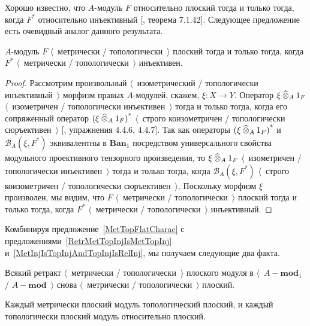 Хорошо известно, что $A$-модуль $F$ относительно плоский тогда и только тогда,
когда $F^*$ относительно инъективный [\cite{HelBanLocConvAlg}, теорема 7.1.42].
Следующее предложение есть очевидный аналог данного результата.

\begin{proposition}\label{MetTopFlatCharac} $A$-модуль $F$ $\langle$~метрически
/ топологически~$\rangle$ плоский тогда и только тогда, когда $F^*$
$\langle$~метрически / топологически~$\rangle$ инъективен.
\end{proposition}
\begin{proof} Рассмотрим произвольный $\langle$~изометрический / топологически
инъективный~$\rangle$ морфизм правых $A$-модулей, скажем, $\xi:X\to Y$. Оператор
$\xi\mathbin{\widehat{\otimes}}_{A} 1_F$ $\langle$~изометричен / топологически
инъективен~$\rangle$ тогда и только тогда, когда его сопряженный оператор
${(\xi\mathbin{\widehat{\otimes}}_{A} 1_F)}^*$ $\langle$~строго коизометричен / топологически
сюръективен~$\rangle$  [\cite{HelLectAndExOnFuncAn}, упражнения 4.4.6, 4.4.7].
Так как операторы ${(\xi\mathbin{\widehat{\otimes}}_{A} 1_F)}^*$ и $\mathcal{B}_A(\xi,F^*)$
эквивалентны в $\mathbf{Ban}_1$ посредством универсального свойства модульного
проективного тензорного произведения, то $\xi\mathbin{\widehat{\otimes}}_{A} 1_F$
$\langle$~изометричен / топологически инъективен~$\rangle$ тогда и только тогда,
когда $\mathcal{B}_A(\xi,F^*)$ $\langle$~строго коизометричен / топологически
сюръективен~$\rangle$. Поскольку морфизм $\xi$ произволен, мы видим, что $F$
$\langle$~метрически / топологически~$\rangle$ плоский тогда и только тогда,
когда $F^*$  $\langle$~метрически / топологически~$\rangle$ инъективный.
\end{proof}

Комбинируя предложение~\ref{MetTopFlatCharac} с
предложениями~\ref{RetrMetTopInjIsMetTopInj}
и~\ref{MetInjIsTopInjAndTopInjIsRelInj}, мы получаем следующие два факта.

\begin{proposition}\label{RetrMetTopFlatIsMetTopFlat} Всякий ретракт
$\langle$~метрически / топологически~$\rangle$ плоского модуля в
$\langle$~$A-\mathbf{mod}_1$ / $A-\mathbf{mod}$~$\rangle$ снова
$\langle$~метрически / топологически~$\rangle$ плоский.
\end{proposition}

\begin{proposition}\label{MetFlatIsTopFlatAndTopFlatIsRelFlat} Каждый метрически
плоский модуль топологический плоский, и каждый топологически плоский модуль
относительно плоский.
\end{proposition}

